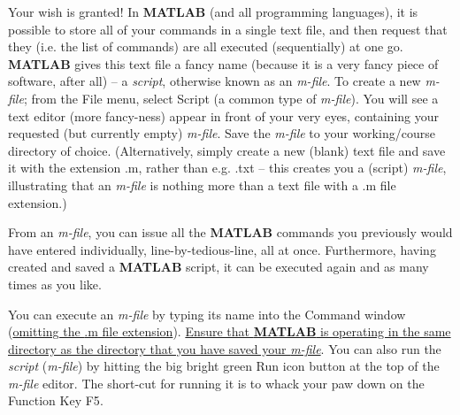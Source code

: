 \documentclass{tufte-book} %
\begin{document}

Your wish is granted! In \textbf{MATLAB} (and all programming languages), it is possible to store all of your commands in a single text file, and then request that they (i.e. the list of commands) are all executed (sequentially)  at one go. \textbf{MATLAB} gives this text file a fancy name (because it is a very fancy piece of software, after all) -- a \textit{script}, otherwise known as an \textit{m-file}.  To create a new \textit{m-file}; from the  \textsf{File menu}, select \textsf{Script} (a common type of \textit{m-file}). You will see a text editor (more fancy-ness) appear in front of your very eyes, containing your requested (but currently empty) \textit{m-file}. Save the \textit{m-file} to your working/course  directory of choice. (Alternatively, simply create a new (blank) text file and save it with the extension \textsf{.m}, rather than e.g. \textsf{.txt} -- this creates you a (script) \textit{m-file}, illustrating that an \textit{m-file} is nothing more than a text file with a \textsf{.m} file extension.) 

From an \textit{m-file}, you can issue all the \textbf{MATLAB} commands you previously would have entered individually, line-by-tedious-line, all at once. Furthermore, having created and saved  a \textbf{MATLAB} script, it can be executed again and as many times as you like.
 
You can execute an \textit{m-file} by typing its name into the \textsf{Command window} (\uline{omitting the \textsf{.m} file extension}). \uline{Ensure that \textbf{MATLAB} is operating in the same directory as the directory that you have saved your \textit{m-file}}. You can also run the \textit{script} (\textit{m-file}) by hitting the big bright green Run icon button at the top of the \textit{m-file} editor. The short-cut for running it is to whack your paw down on the Function Key \textsf{F5}.
\end{document}
